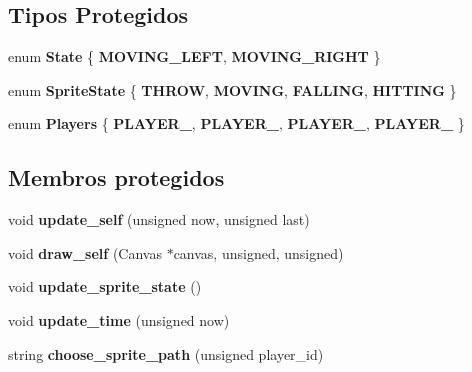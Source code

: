 \subsection*{Tipos Protegidos}
\begin{DoxyCompactItemize}
\item 
\mbox{\label{classSpear_a38f3f25555dd7c7891f373fc8479b717}} 
enum {\bfseries State} \{ {\bfseries M\+O\+V\+I\+N\+G\+\_\+\+L\+E\+FT}, 
{\bfseries M\+O\+V\+I\+N\+G\+\_\+\+R\+I\+G\+HT}
 \}
\item 
\mbox{\label{classSpear_a375643d648eb52266f8d0c6f96c0a6b4}} 
enum {\bfseries Sprite\+State} \{ {\bfseries T\+H\+R\+OW}, 
{\bfseries M\+O\+V\+I\+NG}, 
{\bfseries F\+A\+L\+L\+I\+NG}, 
{\bfseries H\+I\+T\+T\+I\+NG}
 \}
\item 
\mbox{\label{classSpear_aa85adabe13c601a31bdc124f7d75b284}} 
enum {\bfseries Players} \{ {\bfseries P\+L\+A\+Y\+E\+R\+\_}, 
{\bfseries P\+L\+A\+Y\+E\+R\+\_}, 
{\bfseries P\+L\+A\+Y\+E\+R\+\_}, 
{\bfseries P\+L\+A\+Y\+E\+R\+\_}
 \}
\end{DoxyCompactItemize}
\subsection*{Membros protegidos}
\begin{DoxyCompactItemize}
\item 
\mbox{\label{classSpear_ade23821de1d6aaa031c4aa32d214a31c}} 
void {\bfseries update\+\_\+self} (unsigned now, unsigned last)
\item 
\mbox{\label{classSpear_ad38e92681e400061b6755e88a5a0c4e6}} 
void {\bfseries draw\+\_\+self} (Canvas $\ast$canvas, unsigned, unsigned)
\item 
\mbox{\label{classSpear_ab6eeb54661a40ac51e8519e7999e76c8}} 
void {\bfseries update\+\_\+sprite\+\_\+state} ()
\item 
\mbox{\label{classSpear_a7ee5af6e650203296de28f47ff1c2601}} 
void {\bfseries update\+\_\+time} (unsigned now)
\item 
\mbox{\label{classSpear_afb12bb656cde3ea943224874f2c1f54e}} 
string {\bfseries choose\+\_\+sprite\+\_\+path} (unsigned player\+\_\+id)
\end{DoxyCompactItemize}
